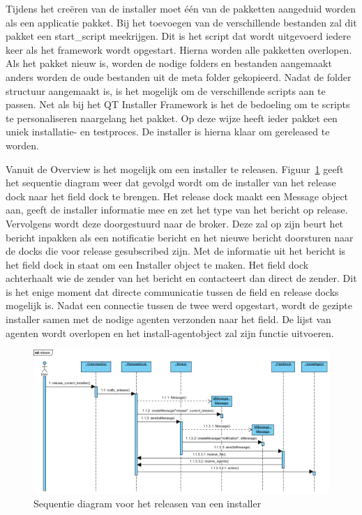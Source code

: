 Tijdens het creëren van de installer moet één van de pakketten aangeduid worden als een applicatie pakket.
Bij het toevoegen van de verschillende bestanden zal dit pakket een start\_script meekrijgen.
Dit is het script dat wordt uitgevoerd iedere keer als het framework wordt opgestart.
Hierna worden alle pakketten overlopen.
Als het pakket nieuw is, worden de nodige folders en bestanden aangemaakt anders worden de oude bestanden uit de meta folder gekopieerd.
Nadat de folder structuur aangemaakt is, is het mogelijk om de verschillende scripts aan te passen.
Net als bij het QT Installer Framework is het de bedoeling om te scripts te personaliseren naargelang het pakket.
Op deze wijze heeft ieder pakket een uniek installatie- en testproces.
De installer is hierna klaar om gereleased te worden.

Vanuit de Overview is het mogelijk om een installer te releasen.
Figuur~\ref{fig:releaseSeq} geeft het sequentie diagram weer dat gevolgd wordt om de installer van het release dock naar het field dock te brengen.
Het release dock maakt een Message object aan, geeft de installer informatie mee en zet het type van het bericht op release.
Vervolgens wordt deze doorgestuurd naar de broker.
Deze zal op zijn beurt het bericht inpakken als een notificatie bericht en het nieuwe bericht doorsturen naar de docks die voor release gesubscribed zijn.
Met de informatie uit het bericht is het field dock in staat om een Installer object te maken.
Het field dock achterhaalt wie de zender van het bericht en contacteert dan direct de zender. Dit is het enige moment dat directe communicatie tussen de field en release docks mogelijk is.
Nadat een connectie tussen de twee werd opgestart, wordt de gezipte installer samen met de nodige agenten verzonden naar het field.
De lijst van agenten wordt overlopen en het install-agentobject zal zijn functie uitvoeren.

\begin{figure}
\includegraphics[width=\textwidth,height=\textheight,keepaspectratio]{afbeelding/seqRelease.png}
\centering
\caption{Sequentie diagram voor het releasen van een installer}
\label{fig:releaseSeq}
\end{figure}

